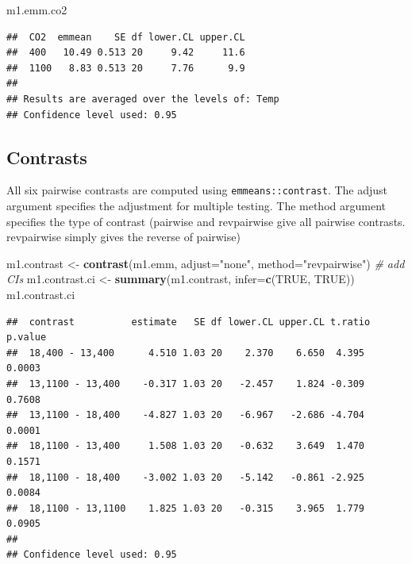 \documentclass[]{book}
\newenvironment{Shaded}{\begin{snugshade}}{\end{snugshade}}
\newcommand{\CommentTok}[1]{\textcolor[rgb]{0.56,0.35,0.01}{\textit{#1}}}
\newcommand{\DataTypeTok}[1]{\textcolor[rgb]{0.13,0.29,0.53}{#1}}
\newcommand{\KeywordTok}[1]{\textcolor[rgb]{0.13,0.29,0.53}{\textbf{#1}}}
\newcommand{\NormalTok}[1]{#1}
\newcommand{\OtherTok}[1]{\textcolor[rgb]{0.56,0.35,0.01}{#1}}
\newcommand{\StringTok}[1]{\textcolor[rgb]{0.31,0.60,0.02}{#1}}
\begin{document}
\begin{Shaded}
\begin{Highlighting}[]
\NormalTok{m1.emm.co2}
\end{Highlighting}
\end{Shaded}

\begin{verbatim}
##  CO2  emmean    SE df lower.CL upper.CL
##  400   10.49 0.513 20     9.42     11.6
##  1100   8.83 0.513 20     7.76      9.9
## 
## Results are averaged over the levels of: Temp 
## Confidence level used: 0.95
\end{verbatim}

\hypertarget{contrasts}{%
\subsection{Contrasts}\label{contrasts}}

All six pairwise contrasts are computed using \texttt{emmeans::contrast}. The adjust argument specifies the adjustment for multiple testing. The method argument specifies the type of contrast (pairwise and revpairwise give all pairwise contrasts. revpairwise simply gives the reverse of pairwise)

\begin{Shaded}
\begin{Highlighting}[]
\NormalTok{m1.contrast <-}\StringTok{ }\KeywordTok{contrast}\NormalTok{(m1.emm, }\DataTypeTok{adjust=}\StringTok{"none"}\NormalTok{, }\DataTypeTok{method=}\StringTok{"revpairwise"}\NormalTok{)}
\CommentTok{# add CIs}
\NormalTok{m1.contrast.ci <-}\StringTok{ }\KeywordTok{summary}\NormalTok{(m1.contrast, }\DataTypeTok{infer=}\KeywordTok{c}\NormalTok{(}\OtherTok{TRUE}\NormalTok{, }\OtherTok{TRUE}\NormalTok{))}
\NormalTok{m1.contrast.ci}
\end{Highlighting}
\end{Shaded}

\begin{verbatim}
##  contrast          estimate   SE df lower.CL upper.CL t.ratio p.value
##  18,400 - 13,400      4.510 1.03 20    2.370    6.650  4.395  0.0003 
##  13,1100 - 13,400    -0.317 1.03 20   -2.457    1.824 -0.309  0.7608 
##  13,1100 - 18,400    -4.827 1.03 20   -6.967   -2.686 -4.704  0.0001 
##  18,1100 - 13,400     1.508 1.03 20   -0.632    3.649  1.470  0.1571 
##  18,1100 - 18,400    -3.002 1.03 20   -5.142   -0.861 -2.925  0.0084 
##  18,1100 - 13,1100    1.825 1.03 20   -0.315    3.965  1.779  0.0905 
## 
## Confidence level used: 0.95
\end{verbatim}
\end{document}
